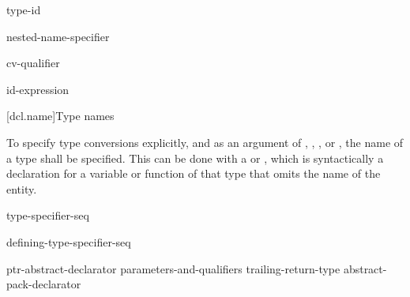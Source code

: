 \begin{bnf}
\br
    \terminal{->} type-id
\end{bnf}

\begin{bnf}
\obeyspaces
{}\br
    \terminal{*}  \br
    \terminal{\&} \br
    \terminal{\&\&} \br
    nested-name-specifier \terminal{*}  
\end{bnf}

\begin{bnf}
\br
    cv-qualifier 
\end{bnf}

\begin{bnf}
\br
    \br
\end{bnf}

\begin{bnf}
\br
    \terminal{\&}\br
    \terminal{\&\&}
\end{bnf}

\begin{bnf}
\br
     id-expression
\end{bnf}

[dcl.name]{Type names}

\pnum
{}%
To specify type conversions explicitly,
%
and as an argument of
,
,
,
or
,
the name of a type shall be specified.
This can be done with a
 or ,
which is syntactically a declaration for a variable or function
of that type that omits the name of the entity.

\begin{bnf}
\br
    type-specifier-seq 
\end{bnf}

\begin{bnf}
\br
    defining-type-specifier-seq 
\end{bnf}

\begin{bnf}
\br
    ptr-abstract-declarator\br
     parameters-and-qualifiers trailing-return-type\br
    abstract-pack-declarator
\end{bnf}

